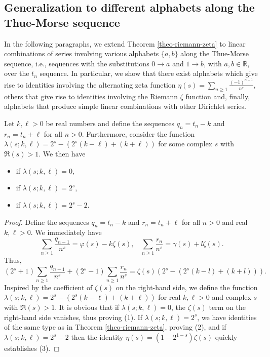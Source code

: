 \documentclass[12pt,reqno]{article}
\begin{document}
\subsection{Generalization to different alphabets along the Thue-Morse sequence}
In the following paragraphs, we extend Theorem \ref{theo-riemann-zeta} to linear combinations of series involving various alphabets $\{a,b\}$ along the Thue-Morse sequence, i.e., sequences with the substitutions $0\to a$ and $1\to b$, with $a,b\in\mathbb{R}$, over the $t_n$ sequence. In particular, we show that there exist alphabets which give rise to identities involving the alternating zeta function $\eta(s) = \sum_{n\geq1} \frac{(-1)^{n-1}}{n^s}$, others that give rise to identities involving the Riemann $\zeta$ function and, finally, alphabets that produce simple linear combinations with other Dirichlet series.
\begin{theorem} \label{theo-alphabets}
	Let $k,\ell>0$ be real numbers and define the sequences $q_n = t_n - k$ and $r_n = t_n + \ell$ for all $n>0$. Furthermore, consider the function $\lambda(s;k,\ell) = 2^s - (2^s (k-\ell) + (k+\ell))$ for some complex $s$ with $\Re(s)>1$. We then have
	\begin{itemize}
		\item[\rm (1)] { if $\lambda(s;k,\ell) = 0$},
		\item[\rm (2)] { if $\lambda(s;k,\ell) = 2^s$,}
		\item[\rm (3)] { if $\lambda(s;k,\ell)=2^s-2$}.
	\end{itemize}
\end{theorem}
\begin{proof}
	Define the sequences $q_n = t_n - k$ and $r_n = t_n + \ell$ for all $n>0$ and real $k,\ell>0$. We immediately have
	$$
	\sum_{n\geq1} \frac{q_{n-1}}{n^s} = \varphi(s) -k\zeta(s), \ \ \ \ \sum_{n\geq1} \frac{r_{n}}{n^s} = \gamma(s) +l\zeta(s).
	$$
	Thus,
	$$
	(2^s+1) \sum_{n\geq1} \frac{q_{n-1}}{n^s} + (2^s-1) \sum_{n\geq1} \frac{r_n}{n^s} = \zeta(s) \left(2^s - (2^s (k-l) + (k+l))\right) .
	$$
	Inspired by the coefficient of $\zeta(s)$ on the right-hand side, we define the function $\lambda(s;k,\ell) = 2^s - (2^s (k-\ell) + (k+\ell))$ for real $k,\ell>0$ and complex $s$ with $\Re(s)>1$. It is obvious that if $\lambda(s;k,\ell)=0$, the $\zeta(s)$ term on the right-hand side vanishes, thus proving (1). If $\lambda(s;k,\ell)=2^s$, we have identities of the same type as in Theorem \ref{theo-riemann-zeta}, proving (2), and if $\lambda(s;k,\ell) = 2^s-2$ then the identity $\eta(s) = \left(1-2^{1-s}\right) \zeta(s)$ quickly establishes (3).
\end{proof}
\end{document}
